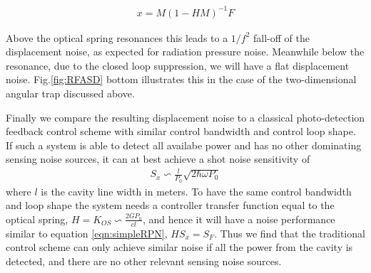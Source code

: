 \begin{eqnarray}
\label{eqn:closedloop_tf}
x = {M}({1-HM})^{-1}F
\end{eqnarray}

Above the optical spring resonances this leads to a $1/f^2$ fall-off of the displacement noise, as expected for radiation pressure noise. Meanwhile below the resonance, due to the closed loop suppression, we will have a flat displacement noise. %
Fig.\ref{fig:RFASD} bottom illustrates this in the case of the two-dimensional angular trap discussed above.

Finally we compare the resulting displacement noise to a classical photo-detection feedback control scheme with similar control bandwidth and control loop shape. If such a system is able to detect all availabe power and has no other dominating sensing noise sources, it can at best achieve a shot noise sensitivity of 
\begin{eqnarray}
\label{eqn:classyShot}
S_x \backsim \frac{l}{P_0}\sqrt{2 \hbar \omega P_0}
\end{eqnarray}
where $l$ is the cavity line width in meters. To have the same control bandwidth and loop shape the system needs a controller transfer function equal to the optical spring, $H = K_{OS} \backsim \frac{2 G P_0}{c l}$, and hence it will have a  noise performance similar to equation \ref{eqn:simpleRPN},  $H S_x=S_F$.  
Thus we find that the traditional control scheme can only achieve similar noise if all the power from the cavity is detected, and there are no other relevant sensing noise sources. 




